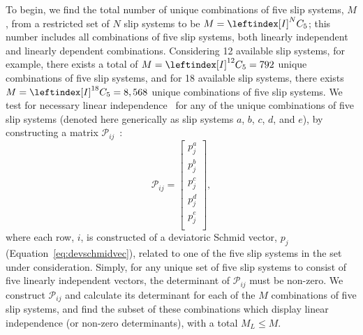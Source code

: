 \documentclass[preprint,3p,times,sort&compress,letterpaper,12pt]{elsarticle} %
\begin{document}
To begin, we find the total number of unique combinations of five slip systems, $M$, from a restricted set of $N$ slip systems to be $M=\leftindex[I]^N {C}_5$; this number includes all combinations of five slip systems, both linearly independent and linearly dependent combinations. Considering 12 available slip systems, for example, there exists a total of $M=\leftindex[I]^{12} {C}_5=792$ unique combinations of five slip systems, and for 18 available slip systems, there exists $M=\leftindex[I]^{18} {C}_5=8,568$ unique combinations of five slip systems. We test for necessary linear independence~\cite{Groves1963,Kocks1964} for any of the unique combinations of five slip systems (denoted here generically as slip systems $a$, $b$, $c$, $d$, and $e$), by constructing a matrix $\mathcal{P}_{ij}$~\cite{Tome1985}:
\begin{equation}
    \label{eq:schmidstens}
    \mathcal{P}_{ij} = \begin{bmatrix}
        p^a_j \\
        p^b_j \\
        p^c_j \\
        p^d_j \\
        p^e_j \\
    \end{bmatrix},
\end{equation}
where each row, $i$, is constructed of a deviatoric Schmid vector, $p_j$ (Equation~\ref{eq:devschmidvec}), related to one of the five slip systems in the set under consideration. Simply, for any unique set of five slip systems to consist of five linearly independent vectors, the determinant of $\mathcal{P}_{ij}$ must be non-zero. We construct $\mathcal{P}_{ij}$ and calculate its determinant for each of the $M$ combinations of five slip systems, and find the subset of these combinations which display linear independence (or non-zero determinants), with a total $M_L \leq M$.
\end{document}
